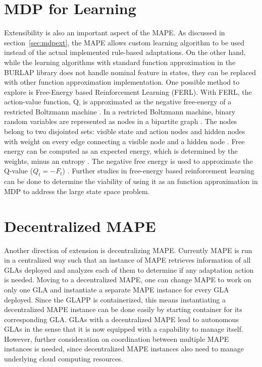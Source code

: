 \documentclass{seal_thesis}
\begin{document}
\section{MDP for Learning}
Extensibility is also an important aspect of the MAPE.
As discussed in section~\ref{sec:mdpext}, the MAPE allows custom learning algorithm to be used instead of the actual implemented rule-based adaptations.
On the other hand, while the learning algorithms with standard function approximation in the BURLAP library does not handle nominal feature in states, they can be replaced with other function approximation implementation.
One possible method to explore is Free-Energy based Reinforcement Learning (FERL).
With FERL, the action-value function, Q, is approximated as the negative free-energy of a restricted Boltzmann machine \cite{sallans2004reinforcement}.
In a restricted Boltzmann machine, binary random variables are represented as nodes in a bipartite graph \cite{sallans2004reinforcement}.
The nodes belong to two disjointed sets: visible state and action nodes and hidden nodes with weight on every edge connecting a visible node and a hidden node \cite{sallans2004reinforcement, 10.3389/fnbot.2013.00003}.
Free energy can be computed as an expected energy, which is determined by the weights, minus an entropy \cite{sallans2004reinforcement}.
The negative free energy is used to approximate the Q-value ($Q_t = -F_t$) \cite{sallans2004reinforcement, 10.3389/fnbot.2013.00003}.
Further studies in free-energy based reinforcement learning can be done to determine the viability of using it as an function approximation in MDP to address the large state space problem.


\section{Decentralized MAPE}
Another direction of extension is decentralizing MAPE.
Currently MAPE is run in a centralized way such that an instance of MAPE retrieves information of all GLAs deployed and analyzes each of them to determine if any adaptation action is needed.
Moving to a decentralized MAPE, one can change MAPE to work on only one GLA and instantiate a separate MAPE instance for every GLA deployed.
Since the GLAPP is containerized, this means instantiating a decentralized MAPE instance can be done easily by starting container for its corresponding GLA.
GLAs with a decentralized MAPE lead to autonomous GLAs in the sense that it is now equipped with a capability to manage itself.
However, further consideration on coordination between multiple MAPE instances is needed, since decentralized MAPE instances also need to manage underlying cloud computing resources.
\end{document}
